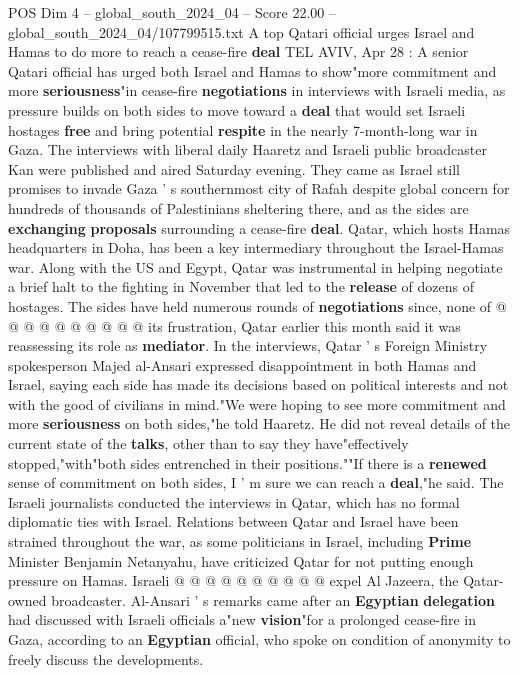 \begin{textsample}{POS Dim 4 – global\_south\_2024\_04 – Score 22.00 – global\_south\_2024\_04/107799515.txt}  \label{ex:f4_pos_263}
A top Qatari official urges Israel and Hamas to do more to reach a cease-fire \textbf{deal} TEL AVIV, Apr 28 : A senior Qatari official has urged both Israel and Hamas to show"more commitment and more \textbf{seriousness}"in cease-fire \textbf{negotiations} in interviews with Israeli media, as pressure builds on both sides to move toward a \textbf{deal} that would set Israeli hostages \textbf{free} and bring potential \textbf{respite} in the nearly 7-month-long war in Gaza.
The interviews with liberal daily Haaretz and Israeli public broadcaster Kan were published and aired Saturday evening.
They came as Israel still promises to invade Gaza ' s southernmost city of Rafah despite global concern for hundreds of thousands of Palestinians sheltering there, and as the sides are \textbf{exchanging} \textbf{proposals} surrounding a cease-fire \textbf{deal}.
Qatar, which hosts Hamas headquarters in Doha, has been a key intermediary throughout the Israel-Hamas war.
Along with the US and Egypt, Qatar was instrumental in helping negotiate a brief halt to the fighting in November that led to the \textbf{release} of dozens of hostages.
The sides have held numerous rounds of \textbf{negotiations} since, none of @ @ @ @ @ @ @ @ @ @ its frustration, Qatar earlier this month said it was reassessing its role as \textbf{mediator}.
In the interviews, Qatar ' s Foreign Ministry spokesperson Majed al-Ansari expressed disappointment in both Hamas and Israel, saying each side has made its decisions based on political interests and not with the good of civilians in mind."We were hoping to see more commitment and more \textbf{seriousness} on both sides,"he told Haaretz.
He did not reveal details of the current state of the \textbf{talks}, other than to say they have"effectively stopped,"with"both sides entrenched in their positions.""If there is a \textbf{renewed} sense of commitment on both sides, I ' m sure we can reach a \textbf{deal},"he said.
The Israeli journalists conducted the interviews in Qatar, which has no formal diplomatic ties with Israel.
Relations between Qatar and Israel have been strained throughout the war, as some politicians in Israel, including \textbf{Prime} Minister Benjamin Netanyahu, have criticized Qatar for not putting enough pressure on Hamas.
Israeli @ @ @ @ @ @ @ @ @ @ expel Al Jazeera, the Qatar-owned broadcaster.
Al-Ansari ' s remarks came after an \textbf{Egyptian} \textbf{delegation} had discussed with Israeli officials a"new \textbf{vision}"for a prolonged cease-fire in Gaza, according to an \textbf{Egyptian} official, who spoke on condition of anonymity to freely discuss the developments.

\end{textsample}

